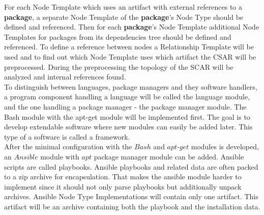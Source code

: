 For each Node Template which uses an artifact with external references to a \textbf{package}, a separate Node Template of the \textbf{package}'s Node Type should be defined and referenced.
Then for each \textbf{package}'s Node Template additional Node Templates for packages from its dependencies tree should be defined and referenced.
To define a reference between nodes a Relationship Template will be used and to find out which Node Template uses which artifact the CSAR will be preprocessed.
During the preprocessing the topology of the SCAR will be analyzed and internal references found.\\
To distinguish between languages, package managers and they software handlers, a program component handling a language will be called the language module, and the one handling a package manager - the package manager module.
The Bash module with the apt-get module will be implemented first. 
The goal is to develop extendable software where new modules can easily be added later.
This type of a software is called a framework.\\
After the minimal configuration with the $Bash$ and $apt$-$get$ modules is developed, an $Ansible$ module with $apt$ package manager module can be added. 
Ansible scripts are called playbooks. 
Ansible playbooks and related data are often packed to a zip archive for encapsulation.
That makes the ansible module harder to implement since it should not only parse playbooks but additionally unpack archives. Ansible Node Type Implementations will contain only one artifact.
This artifact will be an archive containing both the playbook and the installation data.

